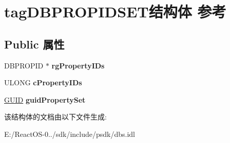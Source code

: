 \hypertarget{structtag_d_b_p_r_o_p_i_d_s_e_t}{}\section{tag\+D\+B\+P\+R\+O\+P\+I\+D\+S\+E\+T结构体 参考}
\label{structtag_d_b_p_r_o_p_i_d_s_e_t}
\subsection*{Public 属性}
\begin{DoxyCompactItemize}
\item 
\mbox{\label{structtag_d_b_p_r_o_p_i_d_s_e_t_a1ca9c75b7176b51250a6e5756148c391}} 
D\+B\+P\+R\+O\+P\+ID $\ast$ {\bfseries rg\+Property\+I\+Ds}
\item 
\mbox{\label{structtag_d_b_p_r_o_p_i_d_s_e_t_a62e9f45c6877af239ab8f5688807a761}} 
U\+L\+O\+NG {\bfseries c\+Property\+I\+Ds}
\item 
\mbox{\label{structtag_d_b_p_r_o_p_i_d_s_e_t_a045c2955ed5adc5da7d4b8c97e9fc35e}} 
\hyperlink{interface_g_u_i_d}{G\+U\+ID} {\bfseries guid\+Property\+Set}
\end{DoxyCompactItemize}


该结构体的文档由以下文件生成\+:\begin{DoxyCompactItemize}
\item 
E\+:/\+React\+O\+S-\/0../sdk/include/psdk/dbs.\+idl\end{DoxyCompactItemize}

